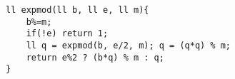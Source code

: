 \begin{verbatim}
ll expmod(ll b, ll e, ll m){
	b%=m;
	if(!e) return 1;
	ll q = expmod(b, e/2, m); q = (q*q) % m;
	return e%2 ? (b*q) % m : q;
}
\end{verbatim}